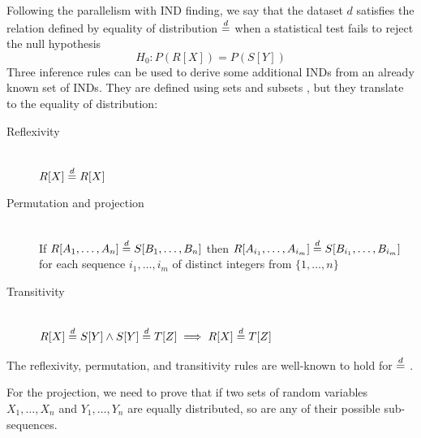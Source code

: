 Following the parallelism with \gls{IND} finding, we say that the dataset $d$ satisfies
the relation defined by equality of distribution $\stackrel{d}{=}$ when a statistical test
fails to reject the null hypothesis
\begin{equation}
    H_0: P(R[X]) = P(S[Y])
    \label{eq:eqdist}
\end{equation}
Three inference rules can be used to derive some additional \glspl{IND} from an already known
set of \glspl{IND}. They are defined using sets and subsets \cite{Casanova1984},
but they translate to the equality of distribution:

\begin{description}
    \item[Reflexivity] \hfill \\
        $R[X] \stackrel{d}{=} R[X]$
    \item[Permutation and projection] \hfill \\
        If $R[A_1,\dots,A_n] \stackrel{d}{=} S[B_1,\dots,B_n]$ then
        $R[A_{i_1},\dots,A_{i_m}] \stackrel{d}{=} S[B_{i_1},\dots,B_{i_m}]$ for each sequence
        $i_1,\dots,i_m$ of distinct integers from $\{1,\dots,n\}$
    \item[Transitivity] \hfill \\
        $ R[X] \stackrel{d}{=} S[Y] \land S[Y] \stackrel{d}{=} T[Z] \implies R[X] \stackrel{d}{=} T[Z]$
\end{description}

The reflexivity, permutation, and transitivity rules are well-known to hold
for $\stackrel{d}{=}$ \cite{randles1979introduction}.

For the projection, we need to prove that if two sets of random variables
$X_1,\dots,X_n$ and $Y_1,\dots,Y_n$ are equally distributed, so are
any of their possible sub-sequences.


